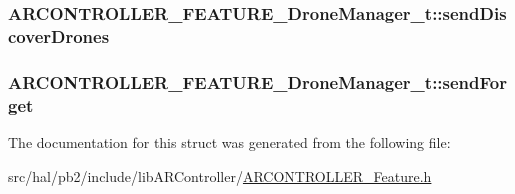 \subsubsection[{\texorpdfstring{send\+Discover\+Drones}{sendDiscoverDrones}}]{ A\+R\+C\+O\+N\+T\+R\+O\+L\+L\+E\+R\+\_\+\+F\+E\+A\+T\+U\+R\+E\+\_\+\+Drone\+Manager\+\_\+t\+::send\+Discover\+Drones}\hypertarget{struct_a_r_c_o_n_t_r_o_l_l_e_r___f_e_a_t_u_r_e___drone_manager__t_a44b9e1bd6dee629d30e9e3ecf5ca932e}{}\label{struct_a_r_c_o_n_t_r_o_l_l_e_r___f_e_a_t_u_r_e___drone_manager__t_a44b9e1bd6dee629d30e9e3ecf5ca932e}
\subsubsection[{\texorpdfstring{send\+Forget}{sendForget}}]{ A\+R\+C\+O\+N\+T\+R\+O\+L\+L\+E\+R\+\_\+\+F\+E\+A\+T\+U\+R\+E\+\_\+\+Drone\+Manager\+\_\+t\+::send\+Forget}\hypertarget{struct_a_r_c_o_n_t_r_o_l_l_e_r___f_e_a_t_u_r_e___drone_manager__t_aa99e27e9fd8ce7e348a4359a223e865a}{}\label{struct_a_r_c_o_n_t_r_o_l_l_e_r___f_e_a_t_u_r_e___drone_manager__t_aa99e27e9fd8ce7e348a4359a223e865a}


The documentation for this struct was generated from the following file\+:\begin{DoxyCompactItemize}
\item 
src/hal/pb2/include/lib\+A\+R\+Controller/\hyperlink{_a_r_c_o_n_t_r_o_l_l_e_r___feature_8h}{A\+R\+C\+O\+N\+T\+R\+O\+L\+L\+E\+R\+\_\+\+Feature.\+h}\end{DoxyCompactItemize}

